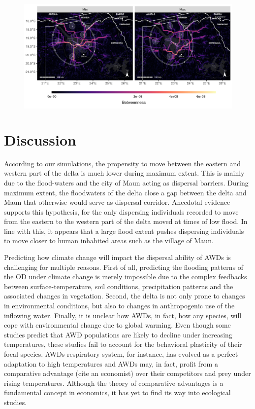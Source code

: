 \documentclass[abstract=on,10pt,a4paper,bibliography=totocnumbered]{article}
\begin{document}
\begin{figure}
  \begin{center}
  \includegraphics[width = \textwidth]{99_Betweenness.png}
  \caption{}
  \label{Betweenness}
  \end{center}
\end{figure}




\section{Discussion}
According to our simulations, the propensity to move between the eastern and
western part of the delta is much lower during maximum extent. This is mainly
due to the flood-waters and the city of Maun acting as dispersal barriers.
During maximum extent, the floodwaters of the delta close a gap between the
delta and Maun that otherwise would serve as dispersal corridor. Anecdotal
evidence supports this hypothesis, for the only dispersing individuals recorded
to move from the eastern to the western part of the delta moved at times of low
flood. In line with this, it appears that a large flood extent pushes dispersing
individuals to move closer to human inhabited areas such as the village of Maun.

Predicting how climate change will impact the dispersal ability of AWDs is
challenging for multiple reasons. First of all, predicting the flooding patterns
of the OD under climate change is merely impossible due to the complex feedbacks
between surface-temperature, soil conditions, precipitation patterns and the
associated changes in vegetation. Second, the delta is not only prone to changes
in environmental conditions, but also to changes in anthropogenic use of the
inflowing water. Finally, it is unclear how AWDs, in fact, how any
species, will cope with environmental change due to global warming. Even though
some studies predict that AWD populations are likely to decline under increasing
temperatures, these studies fail to account for the behavioral plasticity of
their focal species. AWDs respiratory system, for instance, has evolved as a
perfect adaptation to high temperatures and AWDs may, in fact, profit from a
comparative advantage (cite an economist) over their competitors and prey under
rising temperatures. Although the theory of comparative advantages is a
fundamental concept in economics, it has yet to find its way into ecological
studies.
\end{document}
